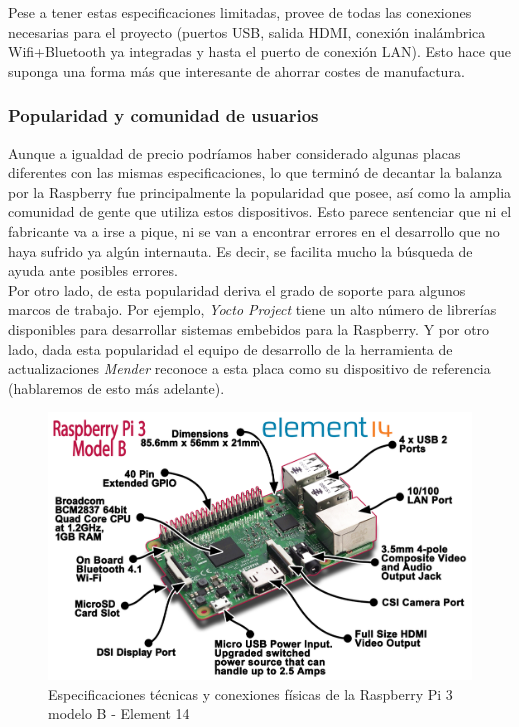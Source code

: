 Pese a tener estas especificaciones limitadas, provee de todas las conexiones necesarias para el proyecto (puertos USB, salida HDMI, conexión inalámbrica Wifi+Bluetooth ya integradas y hasta el puerto de conexión LAN). Esto hace que suponga una forma más que interesante de ahorrar costes de manufactura.\\

\subsubsection{Popularidad y comunidad de usuarios}

Aunque a igualdad de precio podríamos haber considerado algunas placas diferentes con las mismas especificaciones, lo que terminó de decantar la balanza por la Raspberry fue principalmente la popularidad que posee, así como la amplia comunidad de gente que utiliza estos dispositivos. Esto parece sentenciar que ni el fabricante va a irse a pique, ni se van a encontrar errores en el desarrollo que no haya sufrido ya algún internauta. Es decir, se facilita mucho la búsqueda de ayuda ante posibles errores.\\

Por otro lado, de esta popularidad deriva el grado de soporte para algunos marcos de trabajo. Por ejemplo, \textit{Yocto Project} tiene un alto número de librerías disponibles para desarrollar sistemas embebidos para la Raspberry. Y por otro lado, dada esta popularidad el equipo de desarrollo de la herramienta de actualizaciones \textit{Mender} reconoce a esta placa como su dispositivo de referencia \cite{mender-raspberry-pi} (hablaremos de esto más adelante).

\begin{figure}[H]
	\centering
	\includegraphics[width=0.9\linewidth]{imagenes/Pi3+Breakout+Feb+29+2016.png}
	\caption{Especificaciones técnicas y conexiones físicas de la Raspberry Pi 3 modelo B - Element 14 \cite{raspberry-pi-3-model-b-specs}}
	\label{rpi3-b-specs}
\end{figure}

